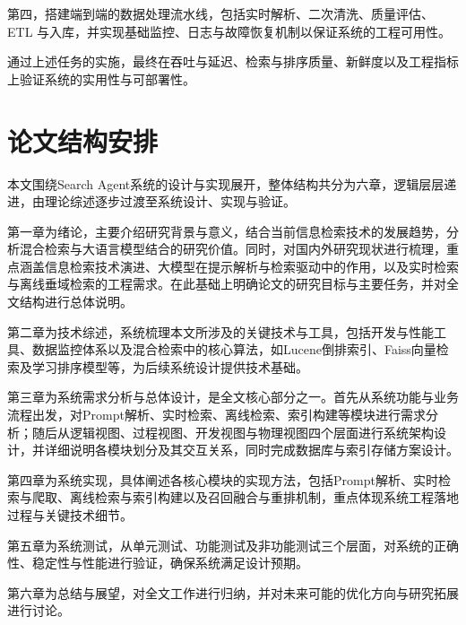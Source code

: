 第四，搭建端到端的数据处理流水线，包括实时解析、二次清洗、质量评估、ETL 与入库，并实现基础监控、日志与故障恢复机制以保证系统的工程可用性。

通过上述任务的实施，最终在吞吐与延迟、检索与排序质量、新鲜度以及工程指标上验证系统的实用性与可部署性。

\section{论文结构安排} 
本文围绕Search Agent系统的设计与实现展开，整体结构共分为六章，逻辑层层递进，由理论综述逐步过渡至系统设计、实现与验证。

第一章为绪论，主要介绍研究背景与意义，结合当前信息检索技术的发展趋势，分析混合检索与大语言模型结合的研究价值。同时，对国内外研究现状进行梳理，重点涵盖信息检索技术演进、大模型在提示解析与检索驱动中的作用，以及实时检索与离线垂域检索的工程需求。在此基础上明确论文的研究目标与主要任务，并对全文结构进行总体说明。

第二章为技术综述，系统梳理本文所涉及的关键技术与工具，包括开发与性能工具、数据监控体系以及混合检索中的核心算法，如Lucene倒排索引、Faiss向量检索及学习排序模型等，为后续系统设计提供技术基础。

第三章为系统需求分析与总体设计，是全文核心部分之一。首先从系统功能与业务流程出发，对Prompt解析、实时检索、离线检索、索引构建等模块进行需求分析；随后从逻辑视图、过程视图、开发视图与物理视图四个层面进行系统架构设计，并详细说明各模块划分及其交互关系，同时完成数据库与索引存储方案设计。

第四章为系统实现，具体阐述各核心模块的实现方法，包括Prompt解析、实时检索与爬取、离线检索与索引构建以及召回融合与重排机制，重点体现系统工程落地过程与关键技术细节。

第五章为系统测试，从单元测试、功能测试及非功能测试三个层面，对系统的正确性、稳定性与性能进行验证，确保系统满足设计预期。

第六章为总结与展望，对全文工作进行归纳，并对未来可能的优化方向与研究拓展进行讨论。